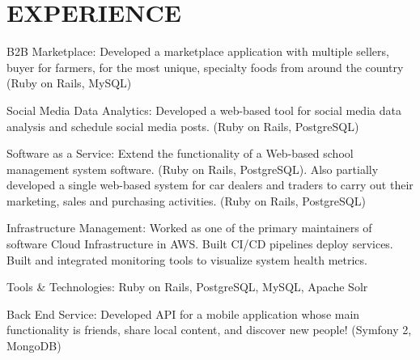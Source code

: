 \documentclass[letterpaper]{deedy-resume} %
\begin{document}
\begin{minipage}[t]{0.66\textwidth} %


\section{EXPERIENCE}

\sectionspace %



\begin{tightitemize}
\sectionspace
\sectionspace
\item B2B Marketplace:
Developed a marketplace application with multiple sellers, buyer for farmers, for the most unique, specialty foods from around the country (Ruby on Rails, MySQL)
\item Social Media Data Analytics:
Developed a web-based tool for social media data analysis and schedule social media posts. (Ruby on Rails, PostgreSQL)
\item Software as a Service:
Extend the functionality of a Web-based school management system software. (Ruby on Rails, PostgreSQL). Also partially developed a single web-based system for car dealers and traders to carry out their marketing, sales and purchasing activities. (Ruby on Rails, PostgreSQL)
\item Infrastructure Management:
Worked as one of the primary maintainers of software Cloud Infrastructure in AWS. Built CI/CD pipelines deploy services. Built and integrated monitoring tools to visualize system health metrics. 
\item Tools & Technologies: Ruby on Rails, PostgreSQL, MySQL, Apache Solr
\end{tightitemize}

\sectionspace %


\sectionspace 
\begin{tightitemize}
\sectionspace
\item Back End Service:
Developed API for a mobile application whose main functionality is friends, share local content, and discover new people! (Symfony 2, MongoDB)


\end{tightitemize}
\end{minipage}
\end{document}
